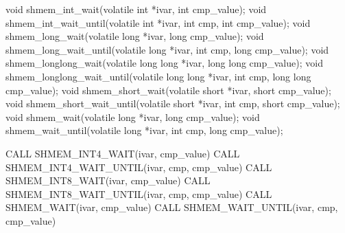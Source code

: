 
\begin{apidefinition}

\begin{Csynopsis}
void shmem_int_wait(volatile int *ivar, int cmp_value);
void shmem_int_wait_until(volatile int *ivar, int cmp, int cmp_value);
void shmem_long_wait(volatile long *ivar, long cmp_value);
void shmem_long_wait_until(volatile long *ivar, int cmp, long cmp_value);
void shmem_longlong_wait(volatile long long *ivar, long long cmp_value);
void shmem_longlong_wait_until(volatile long long *ivar, int cmp, long long cmp_value);
void shmem_short_wait(volatile short *ivar, short cmp_value);
void shmem_short_wait_until(volatile short *ivar, int cmp, short cmp_value);
void shmem_wait(volatile long *ivar, long cmp_value);
void shmem_wait_until(volatile long *ivar, int cmp, long cmp_value);
\end{Csynopsis}

\begin{Fsynopsis}
CALL SHMEM_INT4_WAIT(ivar, cmp_value)
CALL SHMEM_INT4_WAIT_UNTIL(ivar, cmp, cmp_value)
CALL SHMEM_INT8_WAIT(ivar, cmp_value)
CALL SHMEM_INT8_WAIT_UNTIL(ivar, cmp, cmp_value)
CALL SHMEM_WAIT(ivar, cmp_value)
CALL SHMEM_WAIT_UNTIL(ivar, cmp, cmp_value)
\end{Fsynopsis}

\begin{apiarguments}


\end{apiarguments}


\end{apidefinition}
